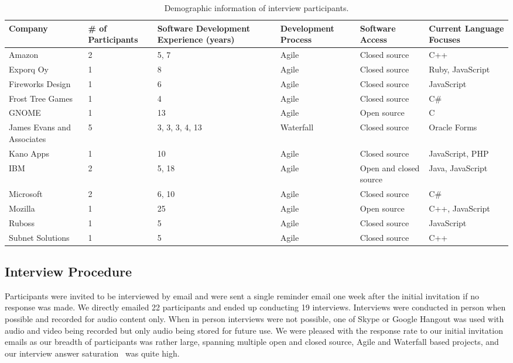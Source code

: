 \documentclass[conference]{IEEEtran}
\begin{document}
\begin{table}[tb!]
\begin{center}
\begin{tabular}{| l | p{2cm} | p{2cm} | p{2cm} | p{2cm} | p{2cm} |}
\hline
Company & \# of Participants & Software Development Experience (years) & Development Process & Software Access & Current Language Focuses \\
\hline
\hline
Amazon & 2 & 5, 7 & Agile & Closed source & C++ \\ \hline
Exporq Oy & 1 & 8 & Agile & Closed source & Ruby, JavaScript \\ \hline
Fireworks Design & 1 & 6 & Agile & Closed source & JavaScript \\ \hline
Frost Tree Games & 1 & 4 & Agile & Closed source & C\# \\ \hline
GNOME & 1 & 13 & Agile & Open source & C \\ \hline
James Evans and Associates & 5 & 3, 3, 3, 4, 13 & Waterfall & Closed source & Oracle Forms \\ \hline
Kano Apps & 1 & 10 & Agile & Closed source & JavaScript, PHP \\ \hline
IBM & 2 & 5, 18 & Agile & Open and closed source & Java, JavaScript \\ \hline
Microsoft & 2 & 6, 10 & Agile & Closed source & C\# \\ \hline
Mozilla & 1 & 25 & Agile & Open source & C++, JavaScript \\ \hline
Ruboss & 1 & 5 & Agile & Closed source & JavaScript \\ \hline 
Subnet Solutions & 1 & 5 & Agile & Closed source & C++ \\ \hline

\end{tabular}
\end{center}
\caption{Demographic information of interview participants.\label{tab:demo}}
\end{table}

\subsection{Interview Procedure}

Participants were invited to be interviewed by email and were sent a single reminder email one week
after the initial invitation if no response was made. We directly emailed 22 participants and ended up conducting
19 interviews. Interviews were conducted in person when possible and recorded for audio content only. When in person
interviews were not possible, one of Skype or Google Hangout was used with audio and video being recorded but only
audio being stored for future use. We were pleased with the response rate to our initial invitation emails as
our breadth of participants was rather large, spanning multiple open and closed source, Agile and Waterfall based projects,
and our interview answer saturation~\cite{Guest:2006:SAP} was quite high.
\end{document}

